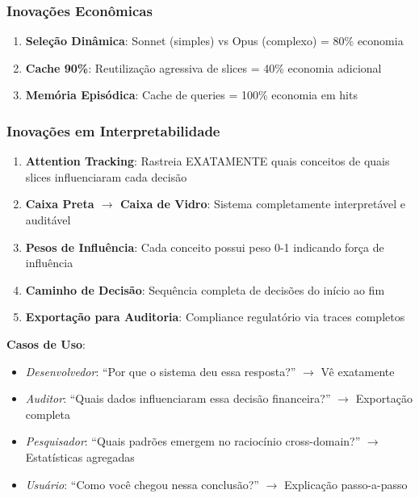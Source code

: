 \documentclass[11pt]{article}
\begin{document}
\subsubsection{Inovações Econômicas}

\begin{enumerate}
    \item \textbf{Seleção Dinâmica}: Sonnet (simples) vs Opus (complexo) = 80\% economia
    \item \textbf{Cache 90\%}: Reutilização agressiva de slices = 40\% economia adicional
    \item \textbf{Memória Episódica}: Cache de queries = 100\% economia em hits
\end{enumerate}

\subsubsection{Inovações em Interpretabilidade}

\begin{enumerate}
    \item \textbf{Attention Tracking}: Rastreia EXATAMENTE quais conceitos de quais slices influenciaram cada decisão
    \item \textbf{Caixa Preta $\rightarrow$ Caixa de Vidro}: Sistema completamente interpretável e auditável
    \item \textbf{Pesos de Influência}: Cada conceito possui peso 0-1 indicando força de influência
    \item \textbf{Caminho de Decisão}: Sequência completa de decisões do início ao fim
    \item \textbf{Exportação para Auditoria}: Compliance regulatório via traces completos
\end{enumerate}

\textbf{Casos de Uso}:
\begin{itemize}
    \item \textit{Desenvolvedor}: ``Por que o sistema deu essa resposta?'' $\rightarrow$ Vê exatamente
    \item \textit{Auditor}: ``Quais dados influenciaram essa decisão financeira?'' $\rightarrow$ Exportação completa
    \item \textit{Pesquisador}: ``Quais padrões emergem no raciocínio cross-domain?'' $\rightarrow$ Estatísticas agregadas
    \item \textit{Usuário}: ``Como você chegou nessa conclusão?'' $\rightarrow$ Explicação passo-a-passo
\end{itemize}
\end{document}
